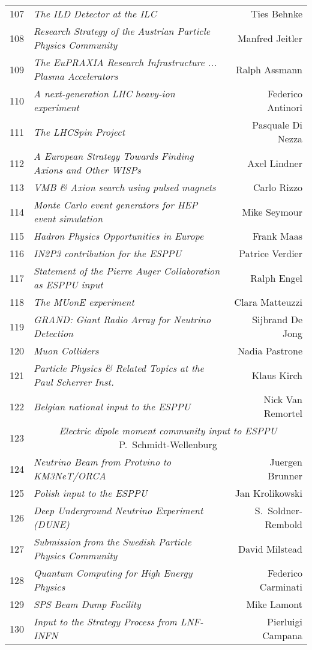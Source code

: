 \begin{flushleft}
\begin{tabular}{llr}
107 & \it The ILD Detector at the ILC & Ties Behnke \\
108 & \it Research Strategy of the Austrian Particle Physics Community & Manfred Jeitler \\
109 & \it The EuPRAXIA Research Infrastructure ... Plasma Accelerators & Ralph Assmann \\
110 & \it A next-generation LHC heavy-ion experiment & Federico Antinori \\
111 & \it The LHCSpin Project & Pasquale Di Nezza \\
112 & \it A European Strategy Towards Finding Axions and Other WISPs & Axel Lindner \\
113 & \it VMB \& Axion search using pulsed magnets & Carlo Rizzo \\
114 & \it Monte Carlo event generators for HEP event simulation & Mike Seymour \\
115 & \it Hadron Physics Opportunities in Europe & Frank Maas \\
116 & \it IN2P3 contribution for the ESPPU & Patrice Verdier \\
117 & \it Statement of the Pierre Auger Collaboration as ESPPU input & Ralph Engel \\
118 & \it The MUonE experiment & Clara Matteuzzi \\
119 & \it GRAND: Giant Radio Array for Neutrino Detection & Sijbrand De Jong \\
120 & \it Muon Colliders & Nadia Pastrone \\
121 & \it Particle Physics \& Related Topics at the Paul Scherrer Inst. & Klaus Kirch \\
122 & \it Belgian national input to the ESPPU & Nick Van Remortel \\
123 & \multicolumn{2}{c}{{\it Electric dipole moment community input to ESPPU} \hfill P.\ Schmidt-Wellenburg} \\
124 & \it Neutrino Beam from Protvino to KM3NeT/ORCA & Juergen Brunner \\
125 & \it Polish input to the ESPPU & Jan Krolikowski \\
126 & \it Deep Underground Neutrino Experiment (DUNE) & S.\ Soldner-Rembold \\
127 & \it Submission from the Swedish Particle Physics Community & David Milstead \\
128 & \it Quantum Computing for High Energy Physics & Federico Carminati \\
129 & \it SPS Beam Dump Facility & Mike Lamont \\
130 & \it Input to the Strategy Process from LNF-INFN & Pierluigi Campana \\
\end{tabular}
\end{flushleft}
